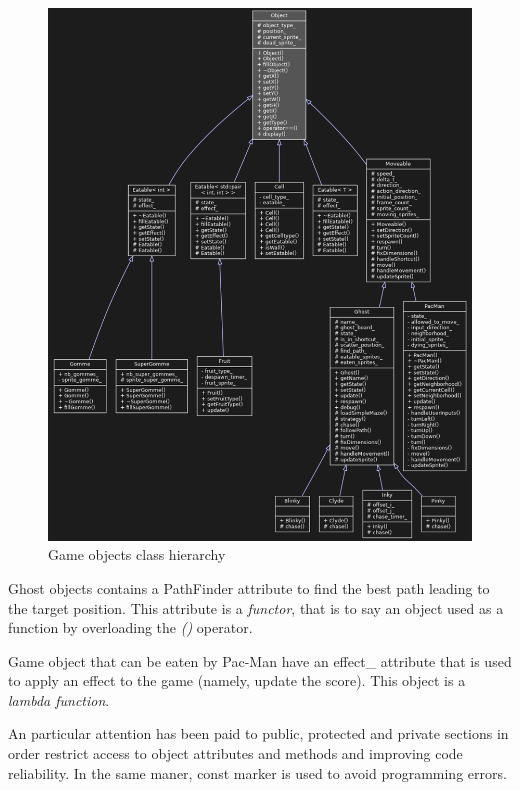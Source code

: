\begin{figure}
    \center
    \includegraphics[scale=.25]{img/class_hierarchy.png}
    \caption{Game objects class hierarchy}
    \label{class_hierarchy}
\end{figure}

\textsf{Ghost} objects contains a \textsf{PathFinder} attribute to find the best path leading to the target position. This attribute is a \textit{functor}, that is to say an object used as a function by overloading the \textit{()} operator.

Game object that can be eaten by Pac-Man have an \textsf{effect\_} attribute that is used to apply an effect to the game (namely, update the score). This object is a \textit{lambda function}.

An particular attention has been paid to \textsf{public}, \textsf{protected} and \textsf{private} sections in order restrict access to object attributes and methods and improving code reliability. In the same maner, \textsf{const} marker is used to avoid programming errors.


